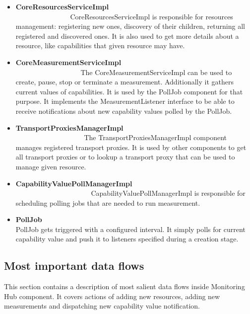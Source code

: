 \begin{itemize}
\item {\bf CoreResourcesServiceImpl}~~~~~~~~~~~~~~~~~~~~~~~~~~~~~~~~~~~~~~~~~~~~~~~~~~~~~~~~\linebreak
CoreResourcesServiceImpl is responsible for resources management: registering new ones, discovery of their children, returning all registered and discovered ones. It is also used to get more details about a resource, like capabilities that given resource may have.

\item {\bf CoreMeasurementServiceImpl}~~~~~~~~~~~~~~~~~~~~~~~~~~~~~~~~~~~~~~~~~~~~~~~~~~~~~~~~\linebreak
The CoreMeasurementServiceImpl can be used to create, pause, stop or terminate a measurement. Additionally it gathers current values of capabilities. It is used by the PollJob component for that purpose. It implements the MeasurementListener interface to be able to receive notifications about new capability values polled by the PollJob. 

\item {\bf TransportProxiesManagerImpl}~~~~~~~~~~~~~~~~~~~~~~~~~~~~~~~~~~~~~~~~~~~~~~~~~~~~~~~~\linebreak
The TransportProxiesManagerImpl component manages registered transport proxies. It is used by other components to get all transport proxies or to lookup a transport proxy that can be used to manage given resource.

\item {\bf CapabilityValuePollManagerImpl}~~~~~~~~~~~~~~~~~~~~~~~~~~~~~~~~~~~~~~~~~~~~~~~~~~~~~~~~\linebreak
CapabilityValuePollManagerImpl is responsible for scheduling polling jobs that are needed to run measurement.

\item {\bf PollJob}~~~~~~~~~~~~~~~~~~~~~~~~~~~~~~~~~~~~~~~~~~~~~~~~~~~~~~~~\linebreak
PollJob gets triggered with a configured interval. It simply polls for current capability value and push it to listeners specified during a creation stage.

\end{itemize}

\pagebreak

\subsection{Most important data flows}

This section contains a description of most salient data flows inside Monitoring Hub component. It covers actions of adding new resources, adding new measurements and dispatching new capability value notification.

